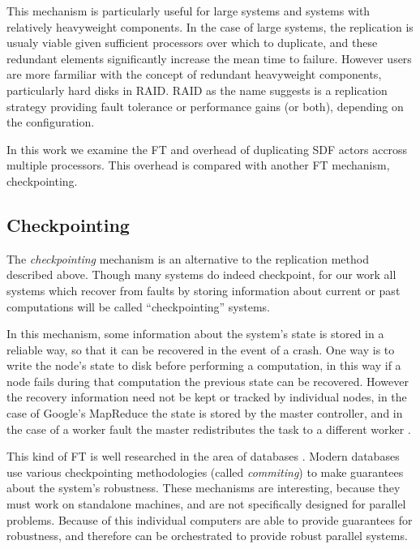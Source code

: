 This mechanism is particularly useful for large systems and systems with relatively heavyweight components.
In the case of large systems, the replication is usualy viable given sufficient processors over which to duplicate, and these redundant elements significantly increase the mean time to failure.
However users are more farmiliar with the concept of redundant heavyweight components, particularly hard disks in RAID.
RAID as the name suggests is a replication strategy providing fault tolerance or performance gains (or both), depending on the configuration.

In this work we examine the FT and overhead of duplicating SDF actors accross multiple processors.
This overhead is compared with another FT mechanism, checkpointing.

\subsection{Checkpointing}
The {\em checkpointing} mechanism is an alternative to the replication method described above.
Though many systems do indeed checkpoint, for our work all systems which recover from faults by storing information about current or past computations will be called ``checkpointing'' systems.

In this mechanism, some information about the system's state is stored in a reliable way, so that it can be recovered in the event of a crash.
One way is to write the node's state to disk before performing a computation, in this way if a node fails during that computation the previous state can be recovered.
However the recovery information need not be kept or tracked by individual nodes, in the case of Google's MapReduce the state is stored by the master controller, and in the case of a worker fault the master redistributes the task to a different worker \cite{dea08}.

This kind of FT is well researched in the area of databases \cite{dbrec}.
Modern databases use various checkpointing methodologies (called {\em commiting}) to make guarantees about the system's robustness.
These mechanisms are interesting, because they must work on standalone machines, and are not specifically designed for parallel problems.
Because of this individual computers are able to provide guarantees for robustness, and therefore can be orchestrated to provide robust parallel systems.